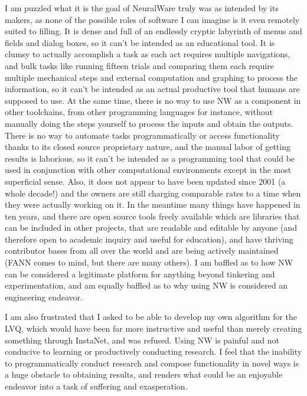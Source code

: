 \documentclass[12pt]{article}
\begin{document}
I am puzzled what it is the goal of NeuralWare truly was as intended by its makers, as none of the possible roles of software I can imagine is it even remotely suited to filling.  It is dense and full of an endlessly cryptic labyrinth of menus and fields and dialog boxes, so it can't be intended as an educational tool.  It is clumsy to actually accomplish a task as each act requires multiple navigations, and bulk tasks like running fifteen trials and comparing them each require multiple mechanical steps and external computation and graphing to process the information, so it can't be intended as an actual productive tool that humans are supposed to use.  At the same time, there is no way to use NW as a component in other toolchains, from other programming languages for instance, without manually doing the steps yourself to process the inputs and obtain the outputs.  There is no way to automate tasks programmatically or access functionality thanks to its closed source proprietary nature, and the manual labor of getting results is laborious, so it can't be intended as a programming tool that could be used in conjunction with other computational environments except in the most superficial sense.  Also, it does not appear to have been updated since 2001 (a whole decade!) and the owners are still charging comparable rates to a time when they were actually working on it.  In the meantime many things have happened in ten years, and there are open source tools freely available which are libraries that can be included in other projects, that are readable and editable by anyone (and therefore open to academic inquiry and useful for education), and have thriving contributor bases from all over the world and are being actively maintained (FANN comes to mind, but there are many others).  I am baffled as to how NW can be considered a legitimate platform for anything beyond tinkering and experimentation, and am equally baffled as to why using NW is considered an engineering endeavor.  

I am also frustrated that I asked to be able to develop my own algorithm for the LVQ, which would have been far more instructive and useful than merely creating something through InstaNet, and was refused.  Using NW is painful and not conducive to learning or productively conducting research.  I feel that the inability to programmatically conduct research and compose functionality in novel ways is a huge obstacle to obtaining results, and renders what could be an enjoyable endeavor into a task of suffering and exasperation.  
\end{document}
